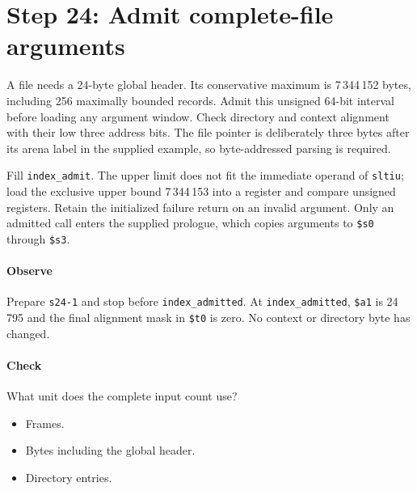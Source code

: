 \section{Step 24: Admit complete-file arguments}
A file needs a 24-byte global header. Its conservative maximum is
7\,344\,152 bytes, including 256 maximally bounded records. Admit this unsigned
64-bit interval before loading any argument window. Check directory and context
alignment with their low three address bits. The file pointer is deliberately
three bytes after its arena label in the supplied example, so byte-addressed
parsing is required.

Fill \texttt{index\_admit}. The upper limit does not fit the immediate operand
of \texttt{sltiu}; load the exclusive upper bound 7\,344\,153 into a register
and compare unsigned registers. Retain the initialized failure return on an
invalid argument. Only an admitted call enters the supplied prologue, which
copies arguments to \texttt{\$s0} through \texttt{\$s3}.

\paragraph{Observe} Prepare \texttt{s24-1} and stop before
\texttt{index\_admitted}. At \texttt{index\_admitted}, \texttt{\$a1} is 24\,795 and
the final alignment mask in \texttt{\$t0} is zero. No context or directory
byte has changed.

\paragraph{Check} What unit does the complete input count use?
\begin{itemize}
  \item[A.] Frames.
  \item[B.] Bytes including the global header.
  \item[C.] Directory entries.
\end{itemize}
